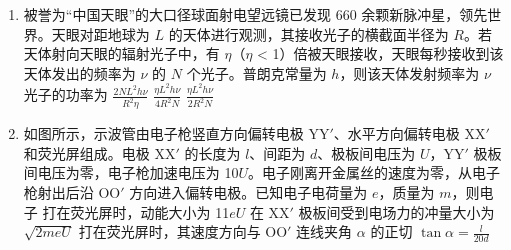 \documentclass[\gkver]{gaokaozhenti}
\begin{document}
\begin{enumerate}
则相邻两次“冲日”时间间隔约为
{火星 800 天}
{天王星 365 天}
{天王星 800 天}

\item
被誉为“中国天眼”的大口径球面射电望远镜已发现 660 余颗新脉冲星，领先世界。天眼对距地球为 $L$ 的天体进行观测，其接收光子的横截面半径为 $R$。若天体射向天眼的辐射光子中，有 $\eta$（$\eta$ < 1）倍被天眼接收，天眼每秒接收到该天体发出的频率为 $\nu$ 的 $N$ 个光子。普朗克常量为 $h$，则该天体发射频率为 $\nu$ 光子的功率为
{$\frac{{2N{L^2}h\nu }}{{{R^2}\eta }}$}
{$\frac{{\eta {L^2}h\nu }}{{4{R^2}N}}$}
{$\frac{{\eta {L^2}h\nu }}{{2{R^2}N}}$}

\item
如图所示，示波管由电子枪竖直方向偏转电极 YY$'$、水平方向偏转电极 XX$'$ 和荧光屏组成。电极 XX$'$ 的长度为 $l$、间距为 $d$、极板间电压为 $U$，YY$'$ 极板间电压为零，电子枪加速电压为 10$U$。电子刚离开金属丝的速度为零，从电子枪射出后沿 OO$'$ 方向进入偏转电极。已知电子电荷量为 $e$，质量为 $m$，则电子
{打在荧光屏时，动能大小为 11$eU$}
{在 XX$'$ 极板间受到电场力的冲量大小为 $\sqrt{2meU}$}
{打在荧光屏时，其速度方向与 OO$'$ 连线夹角 $\alpha$ 的正切 $\tan\alpha = \frac{l}{20d}$}
\end{enumerate}
\end{document}
